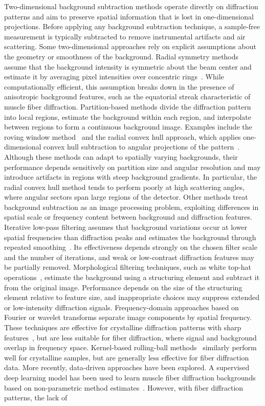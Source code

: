 \documentclass[iucr]{iucrjournals}
\begin{document}
Two-dimensional background subtraction methods operate directly on diffraction patterns and aim to preserve spatial information that is lost in one-dimensional projections. Before applying any background subtraction technique, a sample-free measurement is typically subtracted to remove instrumental artifacts and air scattering. Some two-dimensional approaches rely on explicit assumptions about the geometry or smoothness of the background. Radial symmetry methods assume that the background intensity is symmetric about the beam center and estimate it by averaging pixel intensities over concentric rings~\cite{rajkumar2007fibrefix}. While computationally efficient, this assumption breaks down in the presence of anisotropic background features, such as the equatorial streak characteristic of muscle fiber diffraction. Partition-based methods divide the diffraction pattern into local regions, estimate the background within each region, and interpolate between regions to form a continuous background image. Examples include the roving window method~\cite{HeEtAl2007} and the radial convex hull approach, which applies one-dimensional convex hull subtraction to angular projections of the pattern~\cite{lee2019musclex}. Although these methods can adapt to spatially varying backgrounds, their performance depends sensitively on partition size and angular resolution and may introduce artifacts in regions with steep background gradients. In particular, the radial convex hull method tends to perform poorly at high scattering angles, where angular sectors span large regions of the detector. Other methods treat background subtraction as an image processing problem, exploiting differences in spatial scale or frequency content between background and diffraction features. Iterative low-pass filtering assumes that background variations occur at lower spatial frequencies than diffraction peaks and estimates the background through repeated smoothing~\cite{IvanovaMakowski1998}. Its effectiveness depends strongly on the chosen filter scale and the number of iterations, and weak or low-contrast diffraction features may be partially removed. Morphological filtering techniques, such as white top-hat operations~\cite{GonzalezWoodsDIP4e}, estimate the background using a structuring element and subtract it from the original image. Performance depends on the size of the structuring element relative to feature size, and inappropriate choices may suppress extended or low-intensity diffraction signals. Frequency-domain approaches based on Fourier or wavelet transforms separate image components by spatial frequency. These techniques are effective for crystalline diffraction patterns with sharp features~\cite{PolarBackground2024, WaveletBiomedOptExpress2021, renedecotret2017baseline}, but are less suitable for fiber diffraction, where signal and background overlap in frequency space. Kernel-based rolling-ball methods~\cite{Sternberg1983} similarly perform well for crystalline samples, but are generally less effective for fiber diffraction data. More recently, data-driven approaches have been explored. A supervised deep learning model has been used to learn muscle fiber diffraction backgrounds based on non-parametric method estimates~\cite{ArangurenCarmona2020}. However, with fiber diffraction patterns, the lack of 
\end{document}
